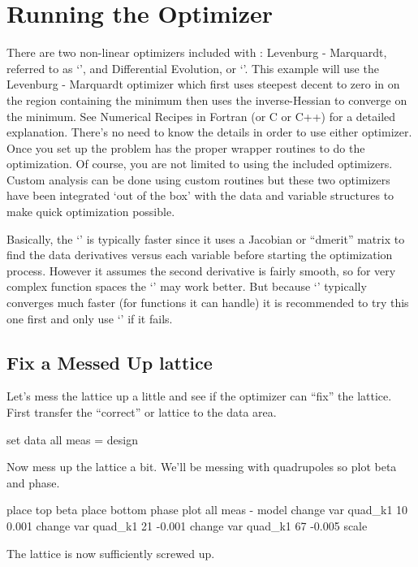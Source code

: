\section{Running the Optimizer}
\label{s:optimizer}

There are two non-linear optimizers included with \tao: Levenburg - Marquardt,
referred to as `', and Differential Evolution, or `'. This example
will use the Levenburg - Marquardt optimizer which first uses steepest decent to
zero in on the region containing the minimum then uses the inverse-Hessian to
converge on the minimum. See Numerical Recipes in Fortran (or C or C++) for a
detailed explanation. There's no need to know the details in order to use
either optimizer. Once you set up the problem \tao has the proper wrapper
routines to do the optimization. Of course, you are not limited to using the
included optimizers. Custom analysis can be done using custom routines but these
two optimizers have been integrated `out of the box' with the \tao data and
variable structures to make quick optimization possible.

Basically, the `' is typically faster since it uses a Jacobian or
``dmerit'' matrix to find the data derivatives versus each variable before
starting the optimization process.  However it assumes the second derivative is
fairly smooth, so for very complex function spaces the `' may work
better. But because `' typically converges much faster (for functions it
can handle) it is recommended to try this one first and only use `' if
it fails. 

\subsection{Fix a Messed Up lattice}
\label{ss:fix_it}

Let's mess the lattice up a little and see if the optimizer can ``fix'' the
lattice. First transfer the ``correct'' or  lattice to the  data area.
\begin{example}
  set data all meas = design
\end{example}
Now mess up the lattice a bit. We'll be messing with quadrupoles so plot
beta and phase.
\begin{example}
  place top beta
  place bottom phase
  plot all meas - model
  change var quad\_k1 10 0.001
  change var quad\_k1 21 -0.001
  change var quad\_k1 67 -0.005
  scale
\end{example}
The lattice is now sufficiently screwed up.

